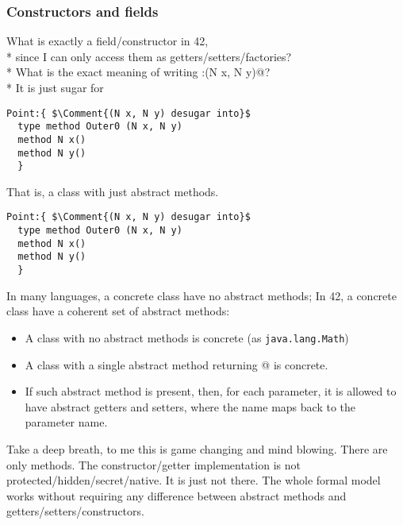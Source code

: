 \begin{frame}[fragile]
\frametitle{Constructors and fields}

%      

\PresentationOnly\pause What is exactly a field/constructor in 42,
${}_{}$\\*
\PresentationOnly\pause since I can only
access them as getters/setters/factories?
${}_{}$\\*
\PresentationOnly\pause What is the exact meaning of writing
\Q@Point:{(N x, N y)}@?
${}_{}$\\*
\PresentationOnly\pause
It is just sugar for 
\begin{NiceCode}{59ex}{1}
\begin{lstlisting}
Point:{ $\Comment{(N x, N y) desugar into}$
  type method Outer0 (N x, N y)
  method N x()
  method N y()
  }
\end{lstlisting}
\end{NiceCode}

That is, a class with just abstract methods.
\end{frame}


\begin{frame}[fragile]
\begin{NiceCode}{59ex}{1}
\begin{lstlisting}
Point:{ $\Comment{(N x, N y) desugar into}$
  type method Outer0 (N x, N y)
  method N x()
  method N y()
  }
\end{lstlisting}
\end{NiceCode}
\PresentationOnly\pause In many languages, a concrete class have no abstract methods;
In 42, a concrete class have a \alert{coherent set} of abstract methods:
\begin{itemize}
\PresentationOnly\pause\item A class with no abstract methods is concrete {\small(as {\texttt{java.lang.Math}})}
\PresentationOnly\pause\item
 A class with a single abstract \Q@type@ method returning @
 is concrete.
\PresentationOnly\pause\item If such abstract \Q@type@ method is present, then, for each parameter,
it is allowed to have abstract getters and setters,
where the name maps back to the parameter name.
\end{itemize}
\PresentationOnly\pause
Take a deep breath, to me this is game changing and mind blowing.
There are only methods. The constructor/getter implementation is not
protected/hidden/secret/native. It is just \alert{not there}.
\PresentationOnly\pause The whole formal model works without requiring any difference between abstract methods
and getters/setters/constructors.

\end{frame}

